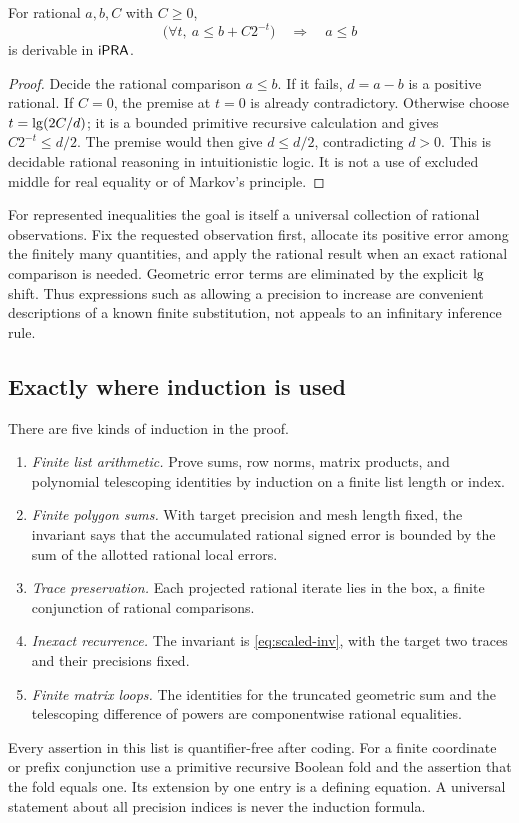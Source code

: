 \begin{lemma}\label{lem:squeeze}
For rational \(a,b,C\) with \(C\ge0\),
\[
 \bigl(\forall t,\ a\le b+C2^{-t}\bigr)
 \quad\Longrightarrow\quad a\le b
\]
is derivable in \(\mathsf{iPRA}\).
\end{lemma}

\begin{proof}
Decide the rational comparison \(a\le b\).
If it fails, \(d=a-b\) is a positive rational.
If \(C=0\), the premise at \(t=0\) is already contradictory.
Otherwise choose \(t=\operatorname{lg}(2C/d)\); it is a bounded
primitive recursive calculation and gives
\(C2^{-t}\le d/2\).
The premise would then give \(d\le d/2\), contradicting
\(d>0\). This is decidable rational reasoning in intuitionistic
logic. It is not a use of excluded middle for real equality
or of Markov's principle.
\end{proof}

For represented inequalities the goal is itself a universal
collection of rational observations. Fix the requested
observation first, allocate its positive error among the
finitely many quantities, and apply the rational result when
an exact rational comparison is needed. Geometric error
terms are eliminated by the explicit \(\operatorname{lg}\) shift.
Thus expressions such as allowing a precision to increase
are convenient descriptions of a known finite substitution,
not appeals to an infinitary inference rule.

\subsection{Exactly where induction is used}

There are five kinds of induction in the proof.
\begin{enumerate}
 \item \emph{Finite list arithmetic.} Prove sums, row norms,
 matrix products, and polynomial telescoping identities by
 induction on a finite list length or index.
 \item \emph{Finite polygon sums.} With target precision and
 mesh length fixed, the invariant says that the accumulated
 rational signed error is bounded by the sum of the
 allotted rational local errors.
 \item \emph{Trace preservation.} Each projected rational
 iterate lies in the box, a finite conjunction of rational
 comparisons.
 \item \emph{Inexact recurrence.} The invariant is
 \eqref{eq:scaled-inv}, with the target two traces and their
 precisions fixed.
 \item \emph{Finite matrix loops.} The identities for the
 truncated geometric sum and the telescoping difference of
 powers are componentwise rational equalities.
\end{enumerate}
Every assertion in this list is quantifier-free after coding.
For a finite coordinate or prefix conjunction use a primitive
recursive Boolean fold and the assertion that the fold equals
one. Its extension by one entry is a defining equation.
A universal statement about all precision indices is never
the induction formula.

